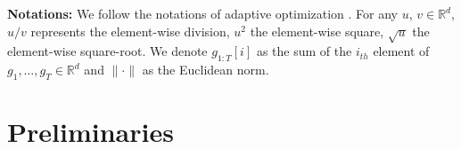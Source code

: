 \documentclass[twoside]{article}
\begin{document}

\textbf{Notations:} 
We follow the notations of adaptive optimization \citep{KB15,RKK18}. 
For any $u$, $v \in \mathbb R^{d}$,  $u/v$ represents the element-wise division,
$u^{2}$ the element-wise square, $\sqrt{u}$ the element-wise square-root.
We denote $g_{1:T}[i]$ as the sum of the $i_{th}$ element of $g_{1},\dots, g_{T} \in \mathbb R^{d}$ and $\| \cdot \|$ as the Euclidean norm.

\vspace{-0.1in}
\section{Preliminaries}\label{sec:prelim}
\vspace{-0.05in}
\end{document}
